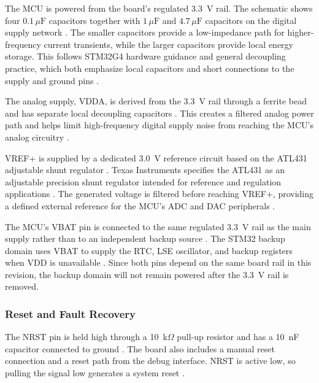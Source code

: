 \documentclass[10pt]{../datasheet}
\begin{document}
The MCU is powered from the board's regulated 3.3~V rail. The schematic shows
four \(0.1\,\mu\mathrm{F}\) capacitors together with \(1\,\mu\mathrm{F}\)
and \(4.7\,\mu\mathrm{F}\) capacitors on the digital supply network
\cite{obc-schematic}. The smaller capacitors provide a low-impedance path for
higher-frequency current transients, while the larger capacitors provide local
energy storage. This follows STM32G4 hardware guidance and general decoupling
practice, which both emphasize local capacitors and short connections to the
supply and ground pins \cite{stm32g4-hardware,analog-devices-decoupling}.

The analog supply, VDDA, is derived from the 3.3~V rail through a ferrite bead
and has separate local decoupling capacitors \cite{obc-schematic}. This creates
a filtered analog power path and helps limit high-frequency digital supply noise
from reaching the MCU's analog circuitry
\cite{stm32g4-hardware,analog-devices-decoupling}.

VREF+ is supplied by a dedicated 3.0~V reference circuit based on the ATL431
adjustable shunt regulator \cite{obc-schematic}. Texas Instruments specifies
the ATL431 as an adjustable precision shunt regulator intended for reference
and regulation applications \cite{atl431-datasheet}. The generated voltage is
filtered before reaching VREF+, providing a defined external reference for the
MCU's ADC and DAC peripherals
\cite{stm32g431-datasheet,obc-schematic,atl431-datasheet}.

The MCU's VBAT pin is connected to the same regulated 3.3~V rail as the main
supply rather than to an independent backup source \cite{obc-schematic}. The
STM32 backup domain uses VBAT to supply the RTC, LSE oscillator, and backup
registers when VDD is unavailable \cite{stm32g431-datasheet}. Since both pins
depend on the same board rail in this revision, the backup domain will not
remain powered after the 3.3~V rail is removed.

\subsubsection{Reset and Fault Recovery}

The NRST pin is held high through a 10~k\(\Omega\) pull-up resistor and has a
10~nF capacitor connected to ground \cite{obc-schematic}. The board also
includes a manual reset connection and a reset path from the debug interface.
NRST is active low, so pulling the signal low generates a system reset
\cite{stm32g431-datasheet,stm32g4-hardware}.
\end{document}
